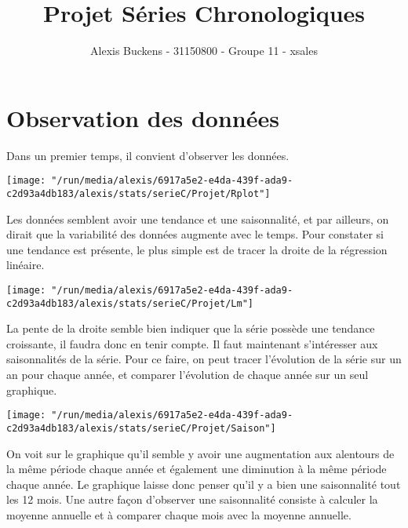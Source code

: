 \documentclass[11pt,a4paper]{article}
\author{Alexis Buckens - 31150800 - Groupe 11 - xsales}
\title{Projet Séries Chronologiques}
\begin{document}
\maketitle
\newpage
\section{Observation des données}

Dans un premier temps, il convient d'observer les données.

\begin{center}
\texttt{[image: "/run/media/alexis/6917a5e2-e4da-439f-ada9-c2d93a4db183/alexis/stats/serieC/Projet/Rplot"]}
\end{center}

Les données semblent avoir une tendance et une saisonnalité, et par ailleurs, on dirait que la variabilité des données augmente avec le temps. Pour constater si une tendance est présente, le plus simple est de tracer la droite de la régression linéaire.
\begin{center}

\texttt{[image: "/run/media/alexis/6917a5e2-e4da-439f-ada9-c2d93a4db183/alexis/stats/serieC/Projet/Lm"]}
\end{center}

La pente de la droite semble bien indiquer que la série possède une tendance croissante, il faudra donc en tenir compte. Il faut maintenant s'intéresser aux saisonnalités de la série. Pour ce faire, on peut tracer l'évolution de la série sur un an pour chaque année, et comparer l'évolution de chaque année sur un seul graphique.

\begin{center}
\texttt{[image: "/run/media/alexis/6917a5e2-e4da-439f-ada9-c2d93a4db183/alexis/stats/serieC/Projet/Saison"]}
\end{center}

	On voit sur le graphique qu'il semble y avoir une augmentation aux alentours de la même période chaque année et également une diminution à la même période chaque année. Le graphique laisse donc penser qu'il y a bien une saisonnalité tout les 12 mois. Une autre façon d'observer une saisonnalité consiste à calculer la moyenne annuelle et à comparer chaque mois avec la moyenne annuelle.
\bigskip
	
\end{document}
